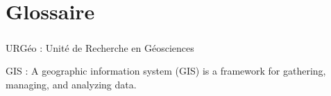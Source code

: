 \chapter{Glossaire}
\paragraph{}
URGéo   : Unité de Recherche en Géosciences \par 
GIS     : A geographic information system (GIS) is a framework for gathering, 
managing, and analyzing data. \par 